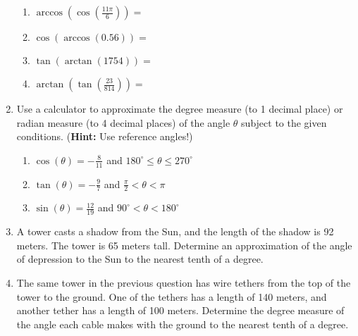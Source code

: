 \begin{enumerate}
\begin{enumerate}
\item $\arccos \left(\cos\left(\frac{11\pi}{6}\right)\right)=$
\vfill


\item $\cos \left(\arccos\left( 0.56 \right)\right) = $
\vfill

\item $\tan \left( \arctan\left(1754\right) \right)=$
\vfill

\item $\arctan \left( \tan\left( \frac{23}{814}\right)\right)=$
\vfill

\end{enumerate}


\clearpage

\item Use a calculator to approximate the degree measure (to 1 decimal place) or radian measure (to 4 decimal places) of the angle $\theta$ subject to the given conditions. (\textbf{Hint:  }Use reference angles!)

\begin{enumerate}
\item $\displaystyle \cos(\theta)=-\frac{8}{11}$ and $180^\circ \leq \theta \leq 270^\circ$
\vfill
\item $\displaystyle \tan(\theta)=-\frac{9}{7}$ and $\frac{\pi}{2}<\theta< \pi$
\vfill
\item $\displaystyle \sin(\theta)=\frac{12}{19}$ and $90^\circ < \theta <180^\circ$
\vfill
\end{enumerate}


\clearpage



\item A tower casts a shadow from the Sun, and the length of the
  shadow is 92 meters. The tower is 65 meters tall. Determine an
  approximation of the angle of depression to the Sun to the nearest
  tenth of a degree.

  \vfill

\item The same tower in the previous question has wire tethers from
  the top of the tower to the ground. One of the tethers has a length
  of 140 meters, and another tether has a length of 100
  meters. Determine the degree measure of the angle each cable makes
  with the ground to the nearest tenth of a degree.
  
  \vfill


\end{enumerate}



